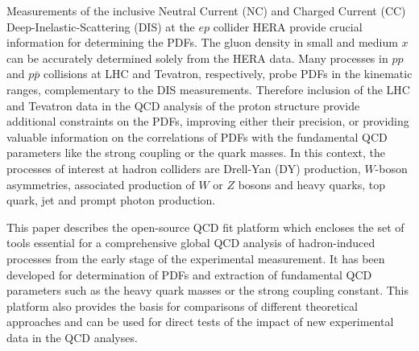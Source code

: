 Measurements of the inclusive Neutral Current (NC) and Charged Current (CC)  
Deep-Inelastic-Scattering (DIS) at the $ep$ collider HERA provide crucial information for determining the PDFs.
%
The gluon density in small and medium $x$  
can be accurately determined solely from the HERA data.
%
Many processes in $pp$ and $p \bar p$ collisions at LHC and Tevatron, respectively, 
probe PDFs in the kinematic ranges, complementary to the DIS measurements.
Therefore inclusion of the LHC and Tevatron data in the QCD analysis of the proton structure 
provide additional constraints on the PDFs, improving either their precision, 
or providing valuable information on the correlations of PDFs with the fundamental 
QCD parameters like the strong coupling or the quark masses. 
%
%
In this context, the processes of interest at hadron colliders are
Drell-Yan (DY) production, $W$-boson asymmetries, associated production of $W$ or $Z$ bosons 
and heavy quarks, top quark, jet and prompt photon production.
%

%

This paper describes the open-source QCD fit platform \fitter which encloses the set of tools  essential for a comprehensive global 
QCD analysis of hadron-induced processes from the early stage of the experimental measurement. 
It has been developed for determination of PDFs and extraction of fundamental QCD parameters such as the heavy
quark masses or the strong coupling constant. This platform also provides the basis for 
comparisons of different theoretical approaches and can be used for direct tests of the impact 
of new experimental data in the QCD analyses.

